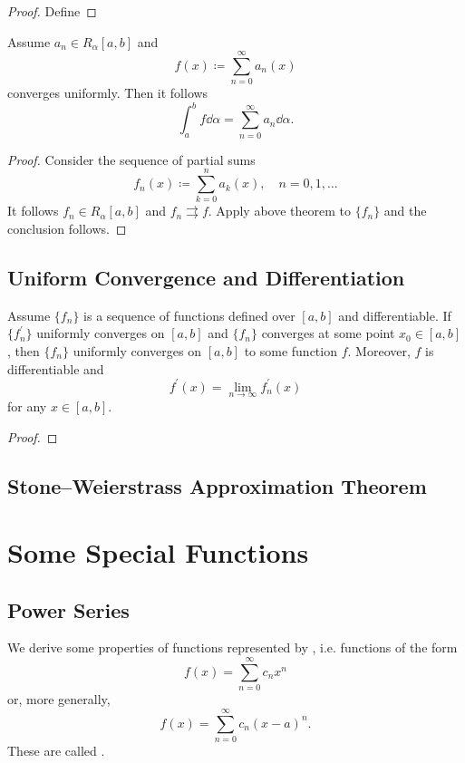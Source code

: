 \begin{proof}
Define
\end{proof}

\begin{corollary}
Assume $a_n\in R_\alpha[a,b]$ and
\[ f(x)\coloneqq\sum_{n=0}^\infty a_n(x) \]
converges uniformly. Then it follows
\[ \int_a^bf\dd{\alpha}=\sum_{n=0}^\infty a_n\dd{\alpha}. \]
\end{corollary}

\begin{proof}
Consider the sequence of partial sums 
\[ f_n(x)\coloneqq\sum_{k=0}^na_k(x), \quad n=0,1,\dots \]
It follows $f_n\in R_\alpha[a,b]$ and $f_n\rightrightarrows f$. Apply above theorem to $\{f_n\}$ and the conclusion follows.
\end{proof}

\section{Uniform Convergence and Differentiation}
\begin{theorem}
Assume $\{f_n\}$ is a sequence of functions defined over $[a,b]$ and differentiable. If $\{f_n^\prime\}$ uniformly converges on $[a,b]$ and $\{f_n\}$ converges at some point $x_0\in[a,b]$, then $\{f_n\}$ uniformly converges on $[a,b]$ to some function $f$. Moreover, $f$ is differentiable and
\[ f^\prime(x)=\lim_{n\to\infty}f_n^\prime(x) \]
for any $x\in[a,b]$.
\end{theorem}

\begin{proof}

\end{proof}

\section{Stone--Weierstrass Approximation Theorem}


\chapter{Some Special Functions}
\section{Power Series}
We derive some properties of functions represented by , i.e. functions of the form
\[ f(x)=\sum_{n=0}^\infty c_nx^n \]
or, more generally,
\[ f(x)=\sum_{n=0}^\infty c_n(x-a)^n. \]
These are called .


